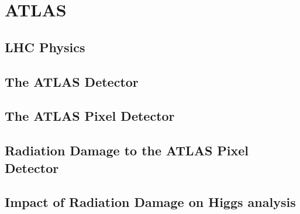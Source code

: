 \chapter{ATLAS}
\label{chap:ATLAS}

\section{LHC Physics}

\section{The ATLAS Detector}

\section{The ATLAS Pixel Detector}

\section{Radiation Damage to the ATLAS Pixel Detector}

\section{Impact of Radiation Damage on Higgs analysis}